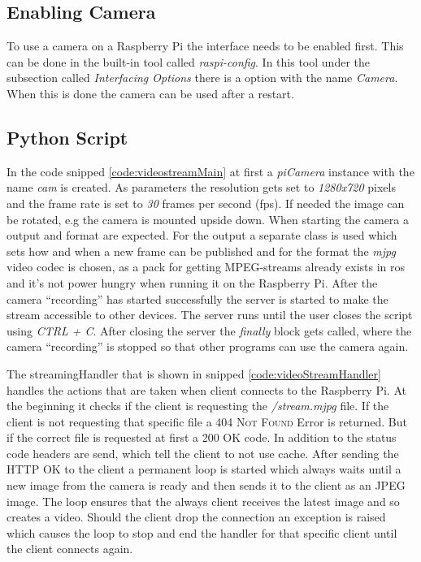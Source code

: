 \subsection{Enabling Camera}
To use a camera on a Raspberry Pi the interface needs to be enabled first. This can be done in the built-in tool called \textit{raspi-config}. In this tool under the subsection called \textit{Interfacing Options} there is a option with the name \textit{Camera}. When this is done the camera can be used after a restart.

\subsection{Python Script}\label{ref:streamPythonScript}
In the code snipped \ref{code:videostreamMain} at first a \textit{piCamera} instance with the name \textit{cam} is created. As parameters the resolution gets set to \textit{1280x720} pixels and the frame rate is set to \textit{30} frames per second (\gls{fps}). If needed the image can be rotated, e.g the camera is mounted upside down. When starting the camera a output and format are expected. For the output a separate class is used which sets how and when a new frame can be published and for the format the \textit{mjpg} video codec is chosen, as a pack for getting MPEG-streams already exists in \gls{ros} and it's not power hungry when running it on the Raspberry Pi. \newline
After the camera \enquote{recording} has started successfully the server is started to make the stream accessible to other devices. The server runs until the user closes the script using \textit{CTRL + C}. After closing the server the \textit{finally} block gets called, where the camera \enquote{recording} is stopped so that other programs can use the camera again.\newline


The streamingHandler that is shown in snipped \ref{code:videoStreamHandler} handles the actions that are taken when client connects to the Raspberry Pi. At the beginning it checks if the client is requesting the \textit{/stream.mjpg} file. If the client is not requesting that specific file a \textsc{404 Not Found} Error is returned. But if the correct file is requested at first a \textsc{200 OK} code. In addition to the status code headers are send, which tell the client to not use cache. After sending the \textsc{HTTP OK} to the client a permanent loop is started which always waits until a new image from the camera is ready and then sends it to the client as an JPEG image. The loop ensures that the always client receives the latest image and so creates a video. Should the client drop the connection an exception is raised which causes the loop to stop and end the handler for that specific client until the client connects again.\newline


